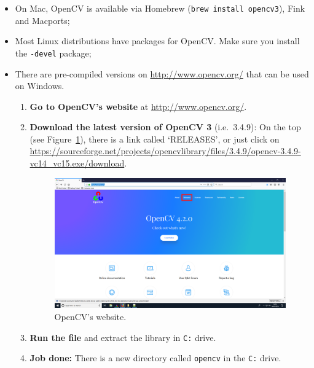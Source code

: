 \documentclass[english,a4paper,12pt,oneside]{article}
\begin{document}
\begin{itemize}
	\item On Mac, OpenCV is available via Homebrew (\verb+brew install opencv3+), Fink and Macports;
 \item Most Linux distributions have packages for OpenCV. Make sure you install the \verb+-devel+ package;
 \item There are pre-compiled versions on \url{http://www.opencv.org/} that can be used on Windows. 
	 \begin{enumerate}
	\item \textbf{Go to OpenCV's website} at \url{http://www.opencv.org/}. 
	\item \textbf{Download the latest version of OpenCV 3} (i.e.~3.4.9): On the top (see Figure~\ref{fig:main_page}), there is a link called `RELEASES', or just click on \url{https://sourceforge.net/projects/opencvlibrary/files/3.4.9/opencv-3.4.9-vc14_vc15.exe/download}. 
		\begin{figure}[tbp]
			\centering
			\includegraphics[width=\textwidth]{opencv_mainpage.png}
			\caption{\label{fig:main_page}OpenCV's website.}
		\end{figure}
	\item \textbf{Run the file} and extract the library in \verb+C:+ drive. %

	\item \textbf{Job done:} There is a new directory called \verb+opencv+ in the \verb+C:+ drive.  
		 \end{enumerate}
\end{itemize}
\end{document}
